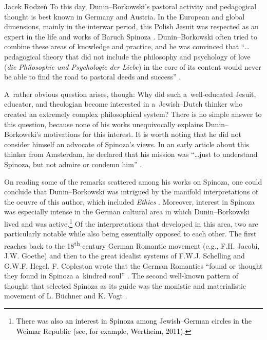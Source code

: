 \begin{artengenv}{Jacek Rodzeń}
To this day, Dunin–Borkowski's pastoral activity and pedagogical thought is best known in Germany and Austria. In the European and global dimensions, mainly in the interwar period, this Polish Jesuit was respected as an expert in the life and works of Baruch Spinoza
\parencite[cf.][p.139]{siwek_stanislaw_1935}. %
 Dunin–Borkowski often tried to combine these areas of knowledge and practice, and he was convinced that ``…pedagogical theory that did not include the philosophy and psychology of love (\textit{die Philosophie und Psychologie der Liebe}) in the core of its content would never be able to find the road to pastoral deeds and success'' 
\parencite[][p.43]{dunin-borkowski_autobiographie_1926}.%


A~rather obvious question arises, though: Why did such a~well-educated Jesuit, educator, and theologian become interested in a~Jewish–Dutch thinker who created an extremely complex philosophical system? There is no simple answer to this question, because none of his works unequivocally explains Dunin–Borkowski's motivations for this interest. It is worth noting that he did not consider himself an advocate of Spinoza's views. In an early article about this thinker from Amsterdam, he declared that his mission was ``…just to understand Spinoza, but not admire or condemn him''
\parencite[][p.126]{dunin-borkowski_leben_1902}.%


On reading some of the remarks scattered among his works on Spinoza, one could conclude that Dunin–Borkowski was intrigued by the manifold interpretations of the oeuvre of this author, which included \textit{Ethics}
\parencite[][p.30]{dunin-borkowski_junge_1910}. %
 Moreover, interest in Spinoza was especially intense in the German cultural area in which Dunin–Borkowski lived and was active.\footnote{\textcolor{black}{There was also an interest in Spinoza among Jewish–German circles in the Weimar Republic} \label{ref:RNDIm3uwTIgBl}\textcolor{black}{(see, for example, Wertheim, 2011})\textcolor{black}{.}} Of the interpretations that developed in this area, two are particularly notable while also being essentially opposed to each other. The first reaches back to the 18\textsuperscript{th}-century German Romantic movement (e.g., F.H. Jacobi, J.W. Goethe) and then to the great idealist systems of F.W.J. Schelling and G.W.F. Hegel. F. Copleston wrote that the German Romantics ``found or thought they found in Spinoza a~kindred soul'' 
\parencite[][p.261]{copleston_history_1994}. %
 The second well-known pattern of thought that selected Spinoza as its guide was the monistic and materialistic movement of L. Büchner and K. Vogt 
\parencite[cf.][]{pawlicki_spinoza_1912}.%



\end{artengenv}
